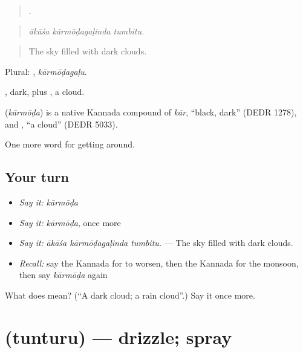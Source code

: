 \begin{quote}
  .
\end{quote}

\begin{quote}
\emph{ākāśa kārmōḍagaḷinda tumbitu.}
\end{quote}

\begin{quote}
The sky filled with dark clouds.
\end{quote}

Plural: , \emph{kārmōḍagaḷu}.

, dark, plus , a cloud.

\begin{cousinweb}
\textbf{} (\emph{kārmōḍa}) is a native Kannada compound of \emph{kār}, \textquotedblleft{}black, dark\textquotedblright{} (DEDR 1278), and , \textquotedblleft{}a cloud\textquotedblright{} (DEDR 5033).
\end{cousinweb}

\begin{grammarlens}[title={What you've built}]
One more word for getting around.
\end{grammarlens}

\subsection*{Your turn}
\begin{itemize}
\raggedright
  \item \emph{Say it:} \emph{kārmōḍa}
  \item \emph{Say it:} \emph{kārmōḍa}, once more
  \item \emph{Say it:} \emph{ākāśa kārmōḍagaḷinda tumbitu.} — The sky filled with dark clouds.
  \item \emph{Recall:} say the Kannada for to worsen, then the Kannada for the monsoon, then say \emph{kārmōḍa} again
\end{itemize}

\begin{tcolorbox}[breakable,colback=teal!4,colframe=teal!35!black,title={Before you move on}]
What does  mean? (\textquotedblleft{}A dark cloud; a rain cloud\textquotedblright{}.) Say it once more.
\end{tcolorbox}
\section[\texorpdfstring{\kn{ತುಂತುರು} (tunturu)}{ತುಂತುರು (tunturu)}]{ (tunturu) — drizzle; spray}

